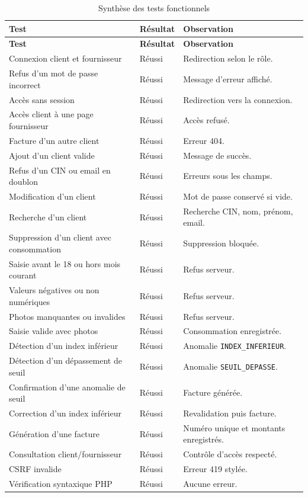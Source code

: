 \begin{longtable}{p{}p{}p{}}
\caption{Synthèse des tests fonctionnels}\label{tab:tests}\\
\toprule
\textbf{Test} & \textbf{Résultat} & \textbf{Observation} \\
\midrule
\endfirsthead
\toprule
\textbf{Test} & \textbf{Résultat} & \textbf{Observation} \\
\midrule
\endhead
Connexion client et fournisseur & Réussi & Redirection selon le rôle. \\
Refus d'un mot de passe incorrect & Réussi & Message d'erreur affiché. \\
Accès sans session & Réussi & Redirection vers la connexion. \\
Accès client à une page fournisseur & Réussi & Accès refusé. \\
Facture d'un autre client & Réussi & Erreur 404. \\
Ajout d'un client valide & Réussi & Message de succès. \\
Refus d'un CIN ou email en doublon & Réussi & Erreurs sous les champs. \\
Modification d'un client & Réussi & Mot de passe conservé si vide. \\
Recherche d'un client & Réussi & Recherche CIN, nom, prénom, email. \\
Suppression d'un client avec consommation & Réussi & Suppression bloquée. \\
Saisie avant le 18 ou hors mois courant & Réussi & Refus serveur. \\
Valeurs négatives ou non numériques & Réussi & Refus serveur. \\
Photos manquantes ou invalides & Réussi & Refus serveur. \\
Saisie valide avec photos & Réussi & Consommation enregistrée. \\
Détection d'un index inférieur & Réussi & Anomalie \texttt{INDEX\_INFERIEUR}. \\
Détection d'un dépassement de seuil & Réussi & Anomalie \texttt{SEUIL\_DEPASSE}. \\
Confirmation d'une anomalie de seuil & Réussi & Facture générée. \\
Correction d'un index inférieur & Réussi & Revalidation puis facture. \\
Génération d'une facture & Réussi & Numéro unique et montants enregistrés. \\
Consultation client/fournisseur & Réussi & Contrôle d'accès respecté. \\
CSRF invalide & Réussi & Erreur 419 stylée. \\
Vérification syntaxique PHP & Réussi & Aucune erreur. \\
\bottomrule
\end{longtable}

